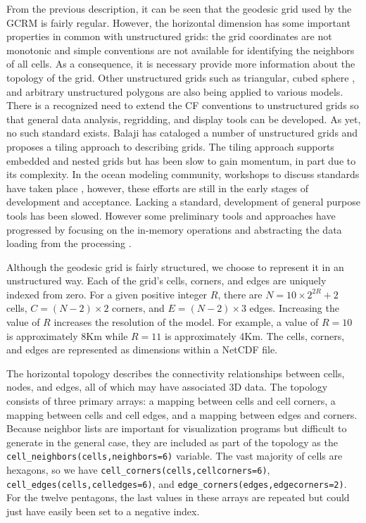 From the previous description, it can be seen that the geodesic grid used by
the GCRM is fairly regular. However, the horizontal dimension has some
important properties in common with unstructured grids: the grid coordinates
are not monotonic and simple conventions are not available for identifying the
neighbors of all cells.  As a consequence, it is necessary provide more
information about the topology of the grid. Other unstructured grids such as
triangular, cubed sphere \cite{CUBE}, and arbitrary unstructured polygons are
also being applied to various models.  There is a recognized need to extend
the CF conventions to unstructured grids so that general data analysis,
regridding, and display tools can be developed. As yet, no such standard
exists.  Balaji has cataloged a number of unstructured grids \cite{Balaji} and
proposes a tiling approach to describing grids.  The tiling approach supports
embedded and nested grids but has been slow to gain momentum, in part due to
its complexity.  In the ocean modeling community, workshops to discuss
standards have taken place \cite{UGRIDS}, however, these efforts are still in
the early stages of development and acceptance.   Lacking a standard,
development of general purpose tools has been slowed.  However some
preliminary tools and approaches have progressed by focusing on the in-memory
operations and abstracting the data loading from the processing \cite{UGRID}. 

Although the geodesic grid is fairly structured, we choose to represent it in
an unstructured way.  Each of the grid's cells, corners, and edges are
uniquely indexed from zero.  For a given positive integer $R$, there are $N =
10 \times 2^{2R} + 2$ cells, $C = (N-2) \times 2$ corners, and $E = (N-2)
\times 3$ edges.  Increasing the value of $R$ increases the resolution of the
model.  For example, a value of $R=10$ is approximately 8Km while $R=11$ is
approximately 4Km.  The cells, corners, and edges are represented as
dimensions within a NetCDF file.

The horizontal topology describes the connectivity relationships between
cells, nodes, and edges, all of which may have associated 3D data.  The
topology consists of three primary arrays: a mapping between cells and cell
corners, a mapping between cells and cell edges, and a mapping between edges
and corners.  Because neighbor lists are important for visualization programs
but difficult to generate in the general case, they are included as part of
the topology as the \verb+cell_neighbors(cells,neighbors=6)+ variable.  The
vast majority of cells are hexagons, so we have
\verb+cell_corners(cells,cellcorners=6)+,
\verb+cell_edges(cells,celledges=6)+, and
\verb+edge_corners(edges,edgecorners=2)+.  For the twelve pentagons, the last
values in these arrays are repeated but could just have easily been set to a
negative index.

